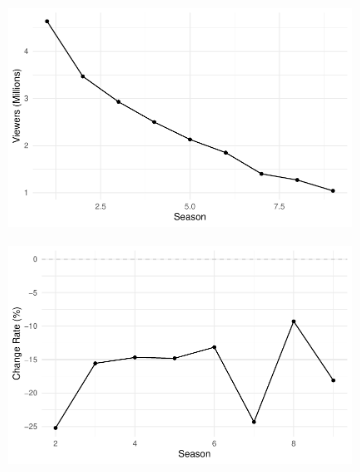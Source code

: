 \documentclass[
  letterpaper,
  DIV=11,
  numbers=noendperiod,
  oneside]{scrartcl}
\begin{document}
\begin{figure}

\begin{minipage}{0.50\linewidth}

\begin{figure}[H]

{\centering \includegraphics{Assignment_TV-Show_files/figure-pdf/unnamed-chunk-1-1.pdf}

}


\end{figure}%

\end{minipage}%
%
\begin{minipage}{0.50\linewidth}

\begin{figure}[H]

{\centering \includegraphics{Assignment_TV-Show_files/figure-pdf/unnamed-chunk-1-2.pdf}

}


\end{figure}%

\end{minipage}%

\end{figure}%
\end{document}
